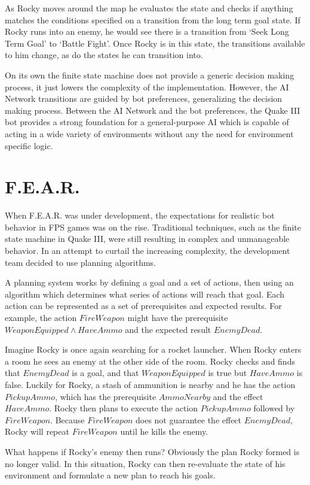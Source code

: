 As Rocky moves around the map he evaluates the state and checks if anything matches the conditions specified on a transition from the long term goal state. If Rocky runs into an enemy, he would see there is a transition from `Seek Long Term Goal' to `Battle Fight'. Once Rocky is in this state, the transitions available to him change, as do the states he can transition into. 

On its own the finite state machine does not provide a generic decision making process, it just lowers the complexity of the implementation. However, the AI Network transitions are guided by bot preferences, generalizing the decision making process. Between the AI Network and the bot preferences, the Quake III bot provides a strong foundation for a general-purpose AI which is capable of acting in a wide variety of environments without any the need for environment specific logic.

\section{F.E.A.R.}

When F.E.A.R. was under development, the expectations for realistic bot behavior in FPS games was on the rise. Traditional techniques, such as the finite state machine in Quake III, were still resulting in complex and unmanageable behavior. In an attempt to curtail the increasing complexity, the development team decided to use planning algorithms.

A planning system works by defining a goal and a set of actions, then using an algorithm which determines what series of actions will reach that goal. Each action can be represented as a set of prerequisites and expected results. For example, the action $FireWeapon$ might have the prerequisite $WeaponEquipped \land HaveAmmo$ and the expected result $EnemyDead$.

Imagine Rocky is once again searching for a rocket launcher. When Rocky enters a room he sees an enemy at the other side of the room. Rocky checks and finds that $EnemyDead$ is a goal, and that $WeaponEquipped$ is true but  $HaveAmmo$ is false. Luckily for Rocky, a stash of ammunition is nearby and he has the action $PickupAmmo$, which has the prerequisite $AmmoNearby$ and the effect $HaveAmmo$. Rocky then plans to execute the action $PickupAmmo$ followed by $FireWeapon$. Because $FireWeapon$ does not guarantee the effect $EnemyDead$, Rocky will repeat $FireWeapon$ until he kills the enemy.

What happens if Rocky's enemy then runs? Obviously the plan Rocky formed is no longer valid. In this situation, Rocky can then re-evaluate the state of his environment and formulate a new plan to reach his goals.

